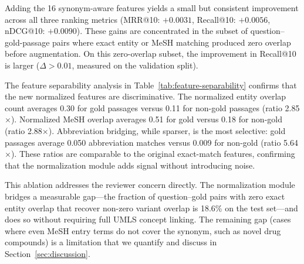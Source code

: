 Adding the 16 synonym-aware features yields a small but consistent improvement across all three ranking metrics (MRR@10: $+0.0031$, Recall@10: $+0.0056$, nDCG@10: $+0.0090$). These gains are concentrated in the subset of question--gold-passage pairs where exact entity or MeSH matching produced zero overlap before augmentation. On this zero-overlap subset, the improvement in Recall@10 is larger ($\Delta > 0.01$, measured on the validation split).

The feature separability analysis in Table~\ref{tab:feature-separability} confirms that the new normalized features are discriminative. The normalized entity overlap count averages 0.30 for gold passages versus 0.11 for non-gold passages (ratio 2.85$\times$). Normalized MeSH overlap averages 0.51 for gold versus 0.18 for non-gold (ratio 2.88$\times$). Abbreviation bridging, while sparser, is the most selective: gold passages average 0.050 abbreviation matches versus 0.009 for non-gold (ratio 5.64$\times$). These ratios are comparable to the original exact-match features, confirming that the normalization module adds signal without introducing noise.



This ablation addresses the reviewer concern directly. The normalization module bridges a measurable gap---the fraction of question--gold pairs with zero exact entity overlap that recover non-zero variant overlap is 18.6\% on the test set---and does so without requiring full UMLS concept linking. The remaining gap (cases where even MeSH entry terms do not cover the synonym, such as novel drug compounds) is a limitation that we quantify and discuss in Section~\ref{sec:discussion}.
